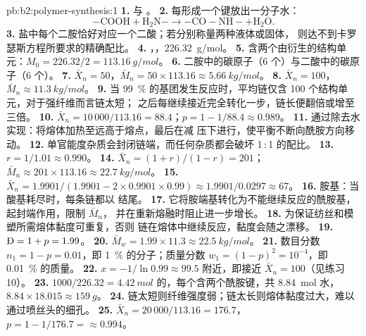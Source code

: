 \begin{solution}{pb:b2:polymer-synthesis:1}
\textbf{1.}  与 。
\textbf{2.} 每形成一个键放出一分子水：
\[\mathrm{{-}COOH + H_2N{-} \longrightarrow {-}CO{-}NH{-} + H_2O}.\]
\textbf{3.} 盐中每个二胺恰好对应一个二酸；若分别称量两种液体或固体，
则达不到卡罗瑟斯方程所要求的精确配比。
\textbf{4.} \ce{-[NH(CH2)6NH-CO(CH2)4CO]-}，，\qty{226.32}{g/mol}。
\textbf{5.} 含两个由衍生的结构单元：$M_0 = 226.32/2 = \qty{113.16}{g/mol}$。
\textbf{6.} 二胺中的碳原子（6 个）与二酸中的碳原子（6 个）。
\textbf{7.} $\bar X_n = 50$，$\bar M_n = 50 \times 113.16 \approx \qty{5.66}{kg/mol}$。
\textbf{8.} $\bar X_n = 100$，$\bar M_n \approx \qty{11.3}{kg/mol}$。
\textbf{9.} 当 99~\% 的基团发生反应时，平均链仅含 100 个结构单元，对于强纤维而言链太短；
之后每继续接近完全转化一步，链长便翻倍或增至三倍。
\textbf{10.} $\bar X_n = 10\,000/113.16 = 88.4$；$p = 1 - 1/88.4 \approx 0.989$。
\textbf{11.} 通过除去水实现：将熔体加热至远高于熔点，最后在减
压下进行，使平衡不断向酰胺方向移动。
\textbf{12.} 单官能度杂质会封闭链端，而任何杂质都会破坏 1\,:\,1 的配比。
\textbf{13.} $r = 1/1.01 \approx 0.990$。
\textbf{14.} $\bar X_n = (1+r)/(1-r) = 201$；$\bar M_n \approx 201 \times 113.16 \approx
\qty{22.7}{kg/mol}$。
\textbf{15.} $\bar X_n = 1.9901/(1.9901 - 2 \times 0.9901 \times 0.99) \approx 1.9901/0.0297 \approx
67$。
\textbf{16.} 胺基：当酸基耗尽时，每条链都以  结尾。
\textbf{17.} 它将胺端基转化为不能继续反应的酰胺基，起封端作用，限制 $\bar M_n$，
并在重新熔融时阻止进一步增长。
\textbf{18.} 为保证纺丝和模塑所需熔体黏度可重复，否则
链在熔体中继续反应，黏度会随之漂移。
\textbf{19.} $\text{\DH} = 1 + p = 1.99$。
\textbf{20.} $\bar M_w = 1.99 \times 11.3 \approx \qty{22.5}{kg/mol}$。
\textbf{21.} 数目分数 $n_1 = 1 - p = 0.01$，即 1~\% 的分子；质量分数 $w_1 = (1-p)^2 =
10^{-4}$，即 0.01~\% 的质量。
\textbf{22.} $x = -1/\ln 0.99 \approx 99.5$ 附近，即接近 $\bar X_n = 100$（见练习 10）。
\textbf{23.} $1000/226.32 = \qty{4.42}{mol}$ 的，每个含两个酰胺键，共
\qty{8.84}{mol} 水，$8.84 \times 18.015 \approx \qty{159}{g}$。
\textbf{24.} 链太短则纤维强度弱；链太长则熔体黏度过大，难以
通过喷丝头的细孔。
\textbf{25.} $\bar X_n = 20\,000/113.16 = 176.7$，$p = 1 - 1/176.7 = \boldsymbol{\approx 0.994}$。
\end{solution}
